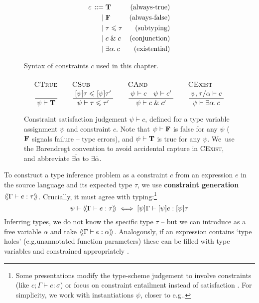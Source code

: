 \begin{figure}
    \centering
    \begin{align*}
        {c} \,::=&\; 
        \mathbf T
        & \text{(always-true)}
        \\ \mid&\;
        \mathbf F
        & \text{(always-false)}
        \\ \mid&\;
        \tau \leqslant \tau 
        & \text{(subtyping)}
        \\ \mid&\;
        c \;\&\; c
         & \text{(conjunction)}
        \\ \mid&\; 
        \exists \alpha \ldotp c
        & \text{(existential)}
    \end{align*}
    \caption{Syntax of constraints $c$ used in this chapter.}
    \label{fig:constraints}
\end{figure}

\begin{figure}
    \centering
    $$
    \irule{CTrue}{}{\psi \vdash \tru}
    \quad
    \irule{CSub}{\substx \psi \tau \sub \substx \psi \tau'}{\psi \vdash \tau \sub \tau'}
    \quad
    \irule{CAnd}{\psi \vdash c \quad \psi \vdash c'}{\psi \vdash c \und c'}
    \quad 
    \irule{CExist}{\psi, \tau/\alpha \vdash c}{\psi \vdash \exists \alpha \ldotp c}
    $$
    \caption{Constraint satisfaction judgement $\psi \vdash c$, defined for a type variable assignment $\psi$ and constraint $c$. Note that $\psi \vdash \mathbf F$ is false for any $\psi$ ($\mathbf F$ signals failure -- type errors), and $\psi \vdash \mathbf T$ is true for any $\psi$. We~use the Barendregt convention to avoid accidental capture in \textsc{CExist}, and abbreviate $\overline {\exists \alpha}$ to $\exists \overline{\alpha}$.}
    \label{fig:satisfaction}
\end{figure}
 
To construct a type inference problem as a constraint $c$ from an expression $e$ in the source language and its expected type $\tau$, we use \textbf{constraint generation} $\cstr{\Gamma}{e}{\tau}$. Crucially, it must agree with typing:\footnote{Some presentations modify the type-scheme judgement to involve constraints (like $c; \Gamma \vdash e : \sigma$) \cite{essence-of-ml-type-inference} or focus on constraint entailment instead of satisfaction \cite{constraint-based-hm}. For simplicity, we work with instantiations $\psi$, closer to e.g.\@ \cite[Section 3.4]{constraint-based-freeze-ml}.}
$$ \psi \vdash \cstr{\Gamma}{e}{\tau} \iff \substx{\psi}\Gamma \vdash \substx{\psi}{e} : \substx \psi \tau $$
Inferring types, we do not know the specific type $\tau$ -- but we can introduce as a free variable $\alpha$ and take $\cstr{\Gamma}{e}{\alpha}$. Analogously, if an expression contains `type holes' (e.g.\@ unannotated function parameters) these can be filled with type variables and constrained appropriately \cite{tapl}.

